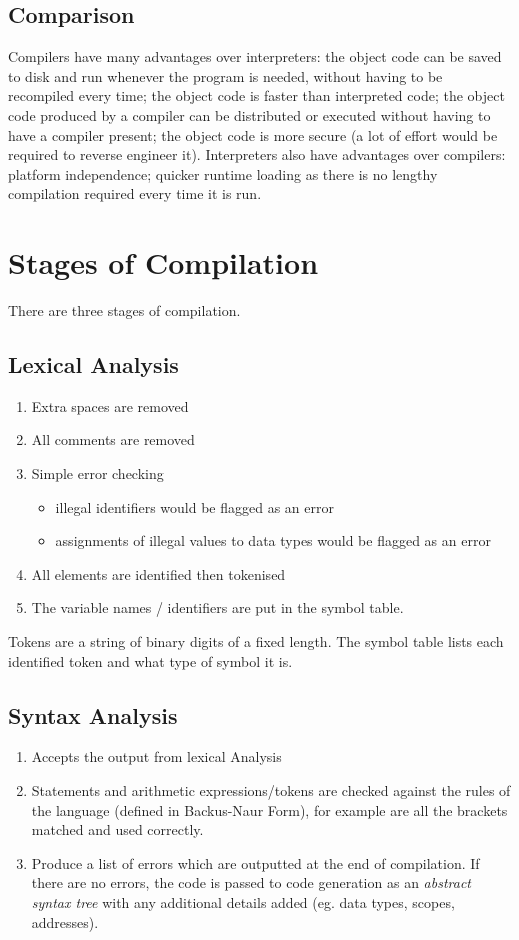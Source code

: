 \documentclass[a4paper,11pt, twocolumn]{article}
\begin{document}
\subsection{Comparison}
Compilers have many advantages over interpreters: the object code can be saved to disk and run whenever the program is needed, without having to be recompiled every time; the object code is faster than interpreted code; the object code produced by a compiler can be distributed or executed without having to have a compiler present; the object code is more secure (a lot of effort would be required to reverse engineer it). Interpreters also have advantages over compilers: platform independence; quicker runtime loading as there is no lengthy compilation required every time it is run.

\section{Stages of Compilation}
There are three stages of compilation.
\subsection{Lexical Analysis}
\begin{enumerate}
    \item Extra spaces are removed
    \item All comments are removed
    \item Simple error checking
    \begin{itemize}
        \item illegal identifiers would be flagged as an error
        \item assignments of illegal values to data types would be flagged as an error
    \end{itemize}
    \item All elements are identified then tokenised
    \item The variable names / identifiers are put in the symbol table.
\end{enumerate}
Tokens are a string of binary digits of a fixed length. The symbol table lists each identified token and what type of symbol it is.
\subsection{Syntax Analysis}
\begin{enumerate}
    \item Accepts the output from lexical Analysis
    \item Statements and arithmetic expressions/tokens are checked against the rules of the language (defined in Backus-Naur Form), for example are all the brackets matched and used correctly.
    \item Produce a list of errors which are outputted at the end of compilation. If there are no errors, the code is passed to code generation as an \textit{abstract syntax tree} with any additional details added (eg. data types, scopes, addresses).
\end{enumerate}
\end{document}
